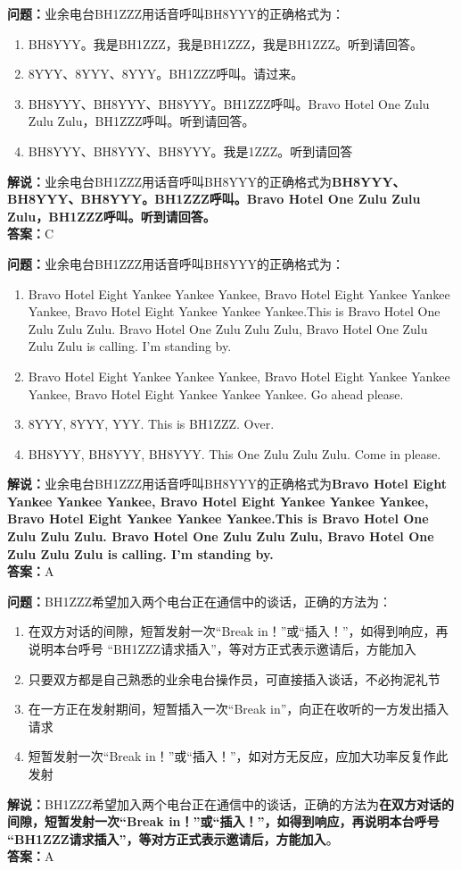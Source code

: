 \textbf{问题：}业余电台BH1ZZZ用话音呼叫BH8YYY的正确格式为：
\begin{enumerate}[label=\Alph*), leftmargin=1.5cm]
	\item BH8YYY。我是BH1ZZZ，我是BH1ZZZ，我是BH1ZZZ。听到请回答。
	\item 8YYY、8YYY、8YYY。BH1ZZZ呼叫。请过来。
	\item BH8YYY、BH8YYY、BH8YYY。BH1ZZZ呼叫。Bravo Hotel One Zulu Zulu Zulu，BH1ZZZ呼叫。听到请回答。
	\item BH8YYY、BH8YYY、BH8YYY。我是1ZZZ。听到请回答
\end{enumerate}
\textbf{解说：}业余电台BH1ZZZ用话音呼叫BH8YYY的正确格式为\textbf{BH8YYY、BH8YYY、BH8YYY。BH1ZZZ呼叫。Bravo Hotel One Zulu Zulu Zulu，BH1ZZZ呼叫。听到请回答。}\\\textbf{答案：}C



\textbf{问题：}业余电台BH1ZZZ用话音呼叫BH8YYY的正确格式为：
\begin{enumerate}[label=\Alph*), leftmargin=1.5cm]
	\item Bravo Hotel Eight Yankee Yankee Yankee, Bravo Hotel Eight Yankee Yankee Yankee, Bravo Hotel Eight Yankee Yankee Yankee.This is Bravo Hotel One Zulu Zulu Zulu. Bravo Hotel One Zulu Zulu Zulu, Bravo Hotel One Zulu Zulu Zulu is calling. I’m standing by.
	\item Bravo Hotel Eight Yankee Yankee Yankee, Bravo Hotel Eight Yankee Yankee Yankee, Bravo Hotel Eight Yankee Yankee Yankee. Go ahead please.
	\item 8YYY, 8YYY, YYY. This is BH1ZZZ. Over.
	\item BH8YYY, BH8YYY, BH8YYY. This One Zulu Zulu Zulu. Come in please.
\end{enumerate}
\textbf{解说：}业余电台BH1ZZZ用话音呼叫BH8YYY的正确格式为\textbf{Bravo Hotel Eight Yankee Yankee Yankee, Bravo Hotel Eight Yankee Yankee Yankee, Bravo Hotel Eight Yankee Yankee Yankee.This is Bravo Hotel One Zulu Zulu Zulu. Bravo Hotel One Zulu Zulu Zulu, Bravo Hotel One Zulu Zulu Zulu is calling. I’m standing by.}\\\textbf{答案：}A



\textbf{问题：}BH1ZZZ希望加入两个电台正在通信中的谈话，正确的方法为：
\begin{enumerate}[label=\Alph*), leftmargin=1.5cm]
	\item 在双方对话的间隙，短暂发射一次“Break in！”或“插入！”，如得到响应，再说明本台呼号 “BH1ZZZ请求插入”，等对方正式表示邀请后，方能加入
	\item 只要双方都是自己熟悉的业余电台操作员，可直接插入谈话，不必拘泥礼节
	\item 在一方正在发射期间，短暂插入一次“Break in”，向正在收听的一方发出插入请求
	\item 短暂发射一次“Break in！”或“插入！”，如对方无反应，应加大功率反复作此发射
\end{enumerate}
\textbf{解说：}BH1ZZZ希望加入两个电台正在通信中的谈话，正确的方法为\textbf{在双方对话的间隙，短暂发射一次“Break in！”或“插入！”，如得到响应，再说明本台呼号 “BH1ZZZ请求插入”，等对方正式表示邀请后，方能加入}。\\\textbf{答案：}A



